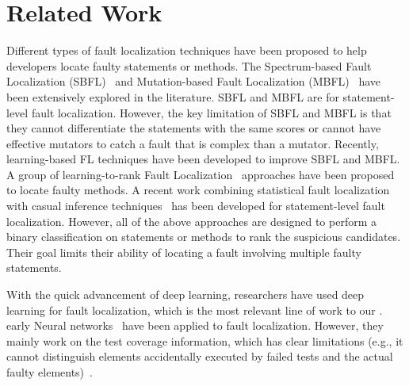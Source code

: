 \section{Related Work}
Different types of fault localization techniques have been proposed to help developers locate faulty statements or methods. 
%
The Spectrum-based Fault Localization (SBFL)~\cite{zhang2011localizing, abreu2007accuracy, jones2005empirical, abreu2006evaluation, naish2011model, wong2007effective, liblit2005scalable, lucia2014extended} and Mutation-based Fault Localization (MBFL)~\cite{papadakis2015metallaxis,MUSE, zhang2013injecting, budd1981mutation, zhang2010test, musco2017large} have been extensively explored in the literature. SBFL and MBFL are for statement-level fault localization. However, the key limitation of SBFL and MBFL is that they cannot differentiate the statements with the same scores or cannot have effective mutators to catch a fault that is complex than a mutator. Recently, learning-based FL techniques have been developed to improve SBFL and MBFL. 
A group of learning-to-rank Fault Localization~\cite{MULTRIC,TraPT,b2016learning,sohn2017fluccs} approaches have been proposed to locate faulty methods. 
A recent work combining statistical fault localization with casual inference techniques~\cite{kuccuk2021improving} has been developed for statement-level fault localization. However, all of the above approaches are designed to perform a binary classification on statements or methods to rank the suspicious candidates. Their goal limits their ability of locating a fault involving multiple faulty statements. 

With the quick advancement of deep learning, researchers have used deep learning for fault localization, which is the most relevant line of work to our {\tool}.
early Neural networks~\cite{zheng2016fault, briand2007using, zhang2017deep, wong2009bp} have been applied to fault localization.  However, they mainly work on the test coverage information, which has clear limitations (e.g., it cannot distinguish elements accidentally executed by failed tests and the actual faulty elements)~\cite{TraPT}. 

